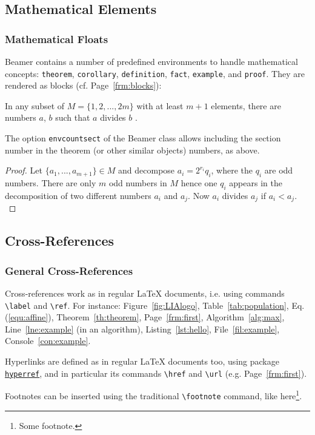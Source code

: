 \documentclass[10pt,    %
    english,            %
    xcolor=table,       %
    envcountsect,       %
    aspectratio=43      %
]{beamer}
\begin{document}
\subsection{Mathematical Elements}
\begin{frame}
    \frametitle{Mathematical Floats}
    
    Beamer contains a number of predefined environments to handle mathematical concepts: \texttt{theorem}, \texttt{corollary}, \texttt{definition}, \texttt{fact}, \texttt{example}, and \texttt{proof}. They are rendered as blocks (cf. Page~\ref{frm:blocks}):
    
    \begin{theorem}
        In any subset of $M = \{1, 2, ... , 2m\}$ with at least $m + 1$ elements, there are numbers $a$, $b$ such that $a$ divides $b$ \cite{Neunhauserer2013}.
        \label{th:theorem}
    \end{theorem} 
    
    The option \texttt{envcountsect} of the Beamer class allows including the section number in the theorem (or other similar objects) numbers, as above.
    
    \begin{proof}
         Let $\{a_1, . . . , a_{m+1}\} \in M$ and decompose $a_i = 2^{r_i} q_i$, where the $q_i$ are odd numbers. There are only $m$ odd numbers in $M$ hence one $q_i$ appears in the decomposition of two different numbers $a_i$ and $a_j$. Now $a_i$ divides $a_j$ if $a_i < a_j$.
        \label{th:proof}
    \end{proof} 
\end{frame}
    




\subsection{Cross-References}
\begin{frame}
    \frametitle{General Cross-References}
    
    Cross-references work as in regular \LaTeX{} documents, i.e. using commands \texttt{\textbackslash{}label} and \texttt{\textbackslash{}ref}. For instance: Figure~\ref{fig:LIAlogo}, Table~\ref{tab:population}, Eq.(\ref{equ:affine}), Theorem~\ref{th:theorem}, Page~\ref{frm:first}, Algorithm~\ref{alg:max}, Line~\ref{lne:example} (in an algorithm), Listing~\ref{lst:hello}, File~\ref{fil:example}, Console~\ref{con:example}.
    
    \medskip
    Hyperlinks are defined as in regular \LaTeX{} documents too, using package \href{https://ctan.org/pkg/hyperref?lang=en}{\texttt{hyperref}}, and in particular its commands \texttt{\textbackslash{}href} and \texttt{\textbackslash{}url} (e.g. Page~\ref{frm:first}).

    \medskip
    Footnotes can be inserted using the traditional \texttt{\textbackslash{}footnote} command, like here\footnote{Some footnote.}.
\end{frame}
\end{document}
